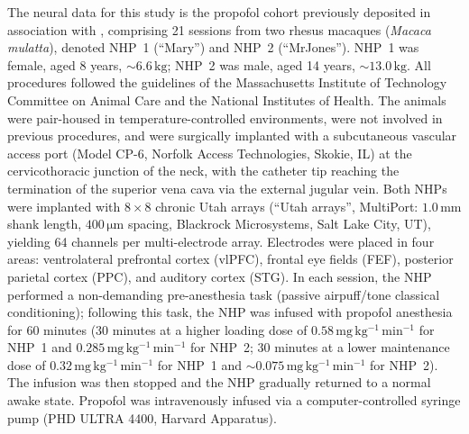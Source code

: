 The neural data for this study is the propofol cohort previously deposited in association with \cite{Eisen2024-vc}, comprising 21 sessions from two rhesus macaques (\textit{Macaca mulatta}), denoted NHP~1 (``Mary'') and NHP~2 (``MrJones''). NHP~1 was female, aged 8 years, $\sim6.6\,\mathrm{kg}$; NHP~2 was male, aged 14 years, $\sim13.0\,\mathrm{kg}$. All procedures followed the guidelines of the Massachusetts Institute of Technology Committee on Animal Care and the National Institutes of Health. The animals were pair-housed in temperature-controlled environments, were not involved in previous procedures, and were surgically implanted with a subcutaneous vascular access port (Model CP-6, Norfolk Access Technologies, Skokie, IL) at the cervicothoracic junction of the neck, with the catheter tip reaching the termination of the superior vena cava via the external jugular vein. Both NHPs were implanted with $8\times 8$ chronic Utah arrays (``Utah arrays'', MultiPort: $1.0\,\mathrm{mm}$ shank length, $400\,\mathrm{\mu m}$ spacing, Blackrock Microsystems, Salt Lake City, UT), yielding 64 channels per multi-electrode array. Electrodes were placed in four areas: ventrolateral prefrontal cortex (vlPFC), frontal eye fields (FEF), posterior parietal cortex (PPC), and auditory cortex (STG). In each session, the NHP performed a non-demanding pre-anesthesia task (passive airpuff/tone classical conditioning); following this task, the NHP was infused with propofol anesthesia for 60 minutes (30 minutes at a higher loading dose of $0.58\,\mathrm{mg\,kg^{-1}\,min^{-1}}$ for NHP~1 and $0.285\,\mathrm{mg\,kg^{-1}\,min^{-1}}$ for NHP~2; 30 minutes at a lower maintenance dose of $0.32\,\mathrm{mg\,kg^{-1}\,min^{-1}}$ for NHP~1 and $\sim 0.075\,\mathrm{mg\,kg^{-1}\,min^{-1}}$ for NHP~2). The infusion was then stopped and the NHP gradually returned to a normal awake state. Propofol was intravenously infused via a computer-controlled syringe pump (PHD ULTRA 4400, Harvard Apparatus).

